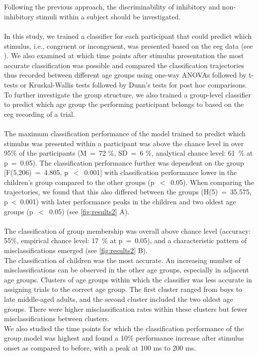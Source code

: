 \\
\\
Following the previous approach, the discriminability of inhibitory and non-inhibitory stimuli within a subject should be investigated.\\
\\
In this study, we trained a classifier for each participant that could predict which stimulus, i.e., congruent or incongruent, was presented based on the \gls{eeg} data (see ). We also examined at which time points after stimulus presentation the most accurate classification was possible and compared the classification trajectories thus recorded between different age groups using one-way ANOVAs followed by t-tests or Kruskal-Wallis tests followed by Dunn’s tests for post hoc comparisons.\\
To further investigate the group structure, we also trained a group-level classifier to predict which age group the performing participant belongs to based on the \gls{eeg} recording of a trial.\\
\\
The maximum classification performance of the model trained to predict which stimulus was presented within a participant was above the chance level in over 95\% of the participants (M~=~72 \%, SD~=~6 \%,  analytical chance level: 61~\% at p~=~0.05). The classification performance further was dependent on the group [F(5,206)~=~4.805, p~$<$~0.001] with classification performance lower in the children's group compared to the other groups (p~$<$~0.05). When comparing the trajectories, we found that this also differed between the groups (H(5)~=~35.575, p~<~0.001) with later performance peaks in the children and two oldest age groups (p~$<$~0.05) (see \autoref{fig:results2} A).\\
\\
The classification of group membership was overall above chance level (accuracy: 55\%, empirical chance level: 17~\% at p~=~0.05), and a characteristic pattern of misclassifications emerged (see \autoref{fig:results2} B).\\
The classification of children was the most accurate. An increasing number of misclassifications can be observed in the other age groups, especially in adjacent age groups. Clusters of age groups within which the classifier was less accurate in assigning trials to the correct age group. The first cluster ranged from boys to late middle-aged adults, and the second cluster included the two oldest age groups. There were higher misclassification rates within these clusters but fewer misclassifications between clusters.\\
We also studied the time points for which the classification performance of the group model was highest and found a 10\% performance increase after stimulus onset as compared to before, with a peak at 100 ms to 200 ms.

